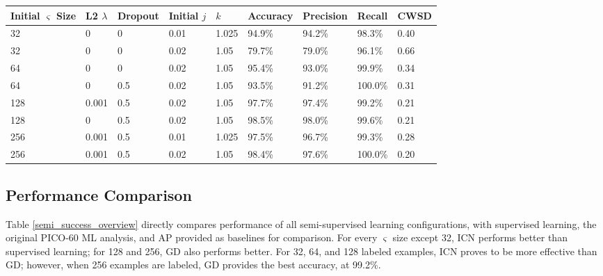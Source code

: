 \documentclass[10pt]{article}
\begin{document}
\begin{minipage}{\textwidth}
    \begin{center}
         \label{icn_overview}
        \begin{tabular}{|l|l|l|l|l|l|l|l|l|}
            \hline
            Initial $\varsigma$ Size & L2 $\lambda$ & Dropout & Initial $j$ & $k$ & Accuracy & Precision & Recall & CWSD \\
            \hline
            32 & 0 & 0 & 0.01 & 1.025 & 94.9\% & 94.2\% & 98.3\% & 0.40 \\
            \hline
            32 & 0 & 0 & 0.02 & 1.05 & 79.7\% & 79.0\% & 96.1\% & 0.66 \\
            \hline
            64 & 0 & 0 & 0.02 & 1.05 & 95.4\% & 93.0\% & 99.9\% & 0.34 \\
            \hline
            64 & 0 & 0.5 & 0.02 & 1.05 & 93.5\% & 91.2\% & 100.0\% & 0.31 \\
            \hline
            128 & 0.001 & 0.5 & 0.02 & 1.05 & 97.7\% & 97.4\% & 99.2\% & 0.21 \\
            \hline
            128 & 0 & 0.5 & 0.02 & 1.05 & 98.5\% & 98.0\% & 99.6\% & 0.21 \\
            \hline
            256 & 0.001 & 0.5 & 0.01 & 1.025 & 97.5\% & 96.7\% & 99.3\% & 0.28 \\
            \hline
            256 & 0.001 & 0.5 & 0.02 & 1.05 & 98.4\% & 97.6\% & 100.0\% & 0.20 \\
            \hline
        \end{tabular}
    \end{center}
\end{minipage}

\subsection{Performance Comparison}

Table \ref{semi_success_overview} directly compares performance of all semi-supervised learning configurations, with supervised learning, the original PICO-60 ML analysis, and AP provided as baselines for comparison. For every $\varsigma$ size except 32, ICN performs better than supervised learning; for 128 and 256, GD also performs better. For 32, 64, and 128 labeled examples, ICN proves to be more effective than GD; however, when 256 examples are labeled, GD provides the best accuracy, at 99.2\%.
\end{document}
